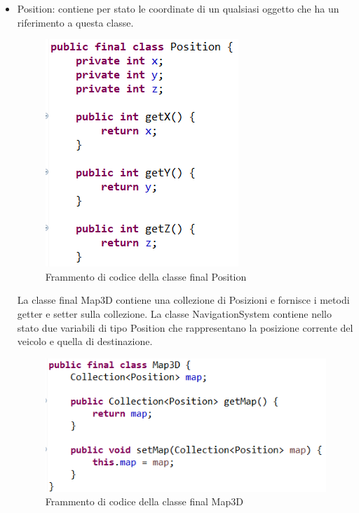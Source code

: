\documentclass{article}
\begin{document}
\begin{itemize}
\item Position: contiene per stato le coordinate di un qualsiasi oggetto che ha un riferimento a questa classe.
\begin{figure} [H]
\begin{center}
\includegraphics[scale=0.8]{Position.png}
\end{center}
\caption{Frammento di codice della classe final Position}
\end{figure}

La classe final Map3D contiene una collezione di Posizioni e fornisce i metodi getter e setter sulla collezione.
La classe NavigationSystem contiene nello stato due variabili di tipo Position che rappresentano la posizione corrente del veicolo e quella di destinazione.
\begin{figure} [H]
\begin{center}
\includegraphics[scale=0.8]{Map3D.png}
\end{center}
\caption{Frammento di codice della classe final Map3D}
\end{figure}


\end{itemize}
\end{document}
